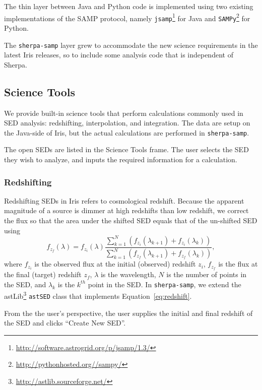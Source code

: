\documentclass[preprint,authoryear,5p]{elsarticle}
\begin{document}
\begin{sloppypar}
The thin layer between Java and Python code is implemented using two existing
implementations of the SAMP protocol, namely
\verb|jsamp|\footnote{\url{http://software.astrogrid.org/p/jsamp/1.3/}} for Java and
\verb|SAMPy|\footnote{\url{http://pythonhosted.org//sampy/}} for Python.
\end{sloppypar}

The \verb|sherpa-samp| layer grew to accommodate the new science requirements in
the latest Iris releases, so to include some analysis code that is
independent of Sherpa.

\subsection{Science Tools} We provide built-in science tools that perform
calculations commonly used in SED analysis: redshifting, interpolation, and
integration. The data are setup on the Java-side of Iris, but the actual
calculations are performed in \verb|sherpa-samp|.

The open SEDs are listed in the Science Tools frame. The user selects the SED
they wish to analyze, and inputs the required information for a calculation.

\subsubsection{Redshifting} Redshifting SEDs in Iris refers to cosmological
redshift. Because the apparent magnitude of a source is dimmer at high redshifts
than low redshift, we correct the flux so that the area under the shifted SED
equals that of the un-shifted SED using
\begin{equation} \label{eq:redshift} f_{z_{f}}(\lambda) = f_{z_{i}}(\lambda)
\frac{\sum_{k=1}^N
(f_{z_{i}}(\lambda_{k+1})+f_{z_{i}}(\lambda_{k}))}{\sum_{k=1}^N
(f_{z_{f}}(\lambda_{k+1})+f_{z_{f}}(\lambda_{k}))}, \end{equation}
where $f_{z_i}$ is the observed flux at the initial (observed) redshift $z_i$,
$f_{z_f}$ is the flux at the final (target) redshift $z_f$, ${\lambda}$ is the
wavelength, $N$ is the number of points in the SED, and $\lambda_{k}$ is the $k^{th}$ 
point in the SED. In \verb|sherpa-samp|, we extend the
astLib\footnote{\url{http://astlib.sourceforge.net/}} \texttt{astSED} class that
implements Equation~\ref{eq:redshift}.

From the the user's perspective, the user supplies the initial and final redshift of the
SED and clicks ``Create New SED''.
\end{document}
